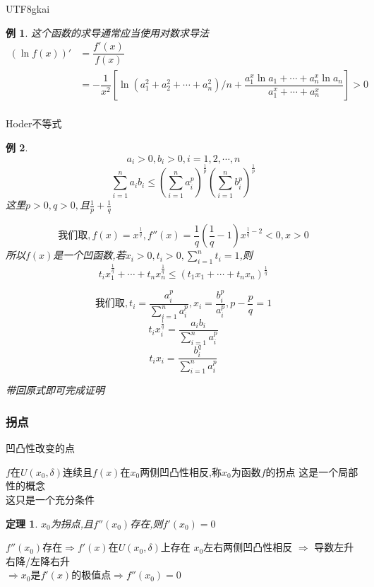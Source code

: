 \documentclass{article}
\newtheorem{theorem}{定理}[subsection]
\newtheorem{example}{例}[subsection]
\newenvironment{cproof}{%
\heiti{证明}\kaishu
}{%
}
\newenvironment{identification}{%
\heiti{定义}\kaishu
}{%
}
\begin{document}
\begin{CJK}{UTF8}{gkai}
\begin{example}
这个函数的求导通常应当使用对数求导法\\

\[
\begin{aligned}
(\ln f(x))' &= \dfrac{f'(x)}{f(x)}\\
&= -\dfrac{1}{x^2}[\ln(a_1^2 + a_2^2 + \cdots + a_n^2)/n + \dfrac{a_1^x \ln  a_1+ \cdots + a_n^x \ln a_n}{a_1^x + \cdots + a_n^x}] > 0\\
\end{aligned}
\]
\end{example}
Hoder不等式\\
\begin{example}
  \[a_i > 0, b_i > 0, i = 1, 2, \cdots, n\]
  \[\sum_{i = 1}^n a_i b_i \leq (\sum_{i= 1}^n a_i^p)^\frac{1}{p}(\sum_{i= 1}^n b_i^p)^\frac{1}{p}\]
  这里$p > 0 ,q > 0 ,$且$\frac{1}{p}+\frac{1}{q}$

  \[\text{我们取},f(x) = x^{\frac{1}{q}},f''(x) = \frac{1}{q}(\frac{1}{q}-1)x^{\frac{1}{q} - 2} < 0 ,x>0\]
  所以$f(x)$是一个凹函数,若$x_i > 0 ,t_i  > 0 ,\sum_{i = 1}^n t_i = 1$,则
  \[t_i x_1^{\frac{1}{q}} + \cdots + t_n x_n^{\frac{1}{q}}  \leq  (t_1 x_1 + \cdots + t_n x_n )^{\frac{1}{q}}\]

  \[\text{我们取},t_i = \dfrac{a_i^p}{\sum_{i=1}^n a_i^p} ,x_i = \dfrac{b_i^p}{a_i^p} , p - \frac{p}{q} = 1\]
  \[t_i x_i^\frac{1}{q} = {\dfrac{a_i b_i}{\sum_{i = 1}^n a_i^p}}\]
  \[t_i x_i = \dfrac{b_i^q}{\sum_{i = 1}^n a_i^p}\]

  带回原式即可完成证明


\end{example}

\subsubsection{拐点}
凹凸性改变的点

\begin{identification}
$f$在$U(x_0,\delta)$连续且$f(x)在x_0$两侧凹凸性相反,称$x_0$为函数$f$的拐点
\end{identification}
这是一个局部性的概念\\

这只是一个充分条件\\
\begin{theorem}
$x_0$为拐点,且$f''(x_0)$存在,则$f'(x_0) = 0$
\end{theorem}
\begin{cproof}
$f''(x_0)$存在$\Rightarrow f'(x)$在$U(x_0,\delta)$上存在
$x_0$左右两侧凹凸性相反 $\Rightarrow$ 导数左升右降/左降右升\\
$\Rightarrow x_0是f'(x)$的极值点$\Rightarrow f''(x_0) = 0$
\end{cproof}


\end{CJK}
\end{document}
